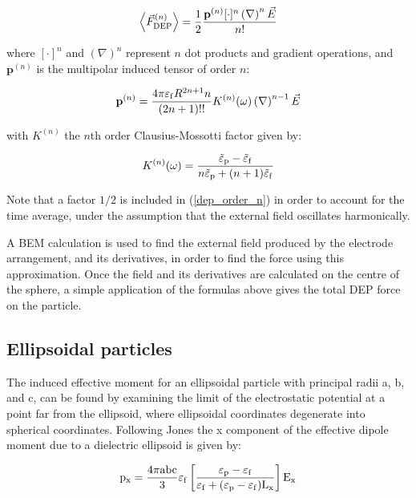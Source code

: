 \documentclass[12pt]{report}
\begin{document}
\begin{equation}\left<\vec{F}_{\rm{DEP}}^{(n)}\right>=\frac{1}{2}\frac{\mathbf{p}^{(n)}[\cdot]^n\left(\nabla\right)^n\vec{E}}{n!}\label{basic_mp_formula}\label{dep_order_n}\end{equation}

where $[\cdot]^n$ and $\left(\nabla\right)^n$ represent $n$ dot products and gradient operations, and $\mathbf{p}^{(n)}$ is the multipolar induced tensor of order $n$:

\begin{equation}\mathbf{p}^{(n)}=\frac{4\pi\varepsilon_{\rm{f}}R^{2n+1}n}{(2n+1)!!}K^{(n)}(\omega)\left(\nabla\right)^{n-1}\vec{E}\end{equation}

with $K^{(n)}$ the $n$th order Clausius-Mossotti factor given by:

\begin{equation}K^{(n)}(\omega)=\frac{\tilde{\varepsilon}_{\rm{p}}-\tilde{\varepsilon}_{\rm{f}}}{n\tilde{\varepsilon}_{\rm{p}}+(n+1)\tilde{\varepsilon}_{\rm{f}}}\end{equation}

Note that a factor $1/2$ is included in (\ref{dep_order_n}) in order to account for the time average, under the assumption that the external field oscillates harmonically.

A BEM calculation is used to find the external field produced by the electrode arrangement, and its derivatives, in order to find the force using this approximation. Once the field and its derivatives are calculated on the centre of the sphere, a simple application of the formulas above gives the total DEP force on the particle. 

\subsection*{Ellipsoidal particles}
The induced effective moment for an ellipsoidal particle with principal radii a, b, and c, can be found by examining the limit of the electrostatic potential at a point far from the ellipsoid, where ellipsoidal coordinates degenerate into spherical coordinates. Following Jones \cite{Jones1995} the x component of the effective dipole moment due to a dielectric ellipsoid is given by:

\begin{equation}\rm{p}_{\rm{x}}=\frac{4\pi abc}{3}\varepsilon_{\rm{f}}\left[\frac{\varepsilon_{\rm{p}}-\varepsilon_{\rm{f}}}{\varepsilon_{\rm{f}}+(\varepsilon_{\rm{p}}-\varepsilon_{\rm{f}})L_{\rm{x}}}\right]E_{\rm{x}}\end{equation}
\end{document}
